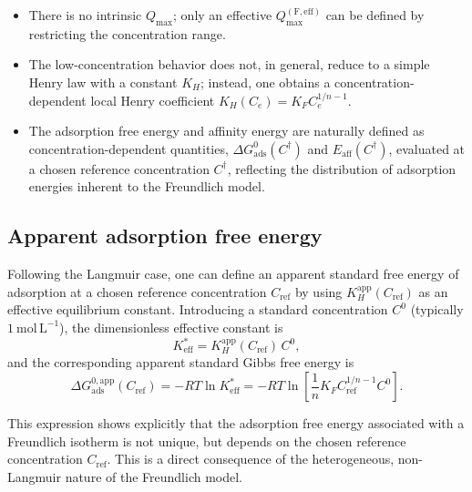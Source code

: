 	\begin{itemize}
		\item There is no intrinsic \(Q_{\max}\); only an effective
		\(Q_{\max}^{\mathrm{(F,eff)}}\) can be defined by restricting the
		concentration range.
		
		\item The low-concentration behavior does not, in general, reduce
		to a simple Henry law with a constant \(K_H\); instead, one obtains
		a concentration-dependent local Henry coefficient
		\(K_H(C_e) = K_F C_e^{1/n - 1}\).
		
		\item The adsorption free energy and affinity energy are naturally
		defined as concentration-dependent quantities,
		\(\Delta G_{\mathrm{ads}}^{0}(C^{\dagger})\) and
		\(E_{\mathrm{aff}}(C^{\dagger})\), evaluated at a chosen reference
		concentration \(C^{\dagger}\), reflecting the distribution of
		adsorption energies inherent to the Freundlich model.
	\end{itemize}
	
	\subsection{Apparent adsorption free energy}
	
	Following the Langmuir case, one can define an apparent standard free energy
	of adsorption at a chosen reference concentration $C_{\mathrm{ref}}$ by using
	$K_H^{\mathrm{app}}(C_{\mathrm{ref}})$ as an effective equilibrium constant.
	Introducing a standard concentration $C^0$ (typically
	$1~\mathrm{mol\,L^{-1}}$), the dimensionless effective constant is
	\begin{equation}
		K_{\mathrm{eff}}^{\ast}
		= K_H^{\mathrm{app}}(C_{\mathrm{ref}})\, C^0,
	\end{equation}
	and the corresponding apparent standard Gibbs free energy is
	\begin{equation}
		\Delta G_{\mathrm{ads}}^{0,\mathrm{app}}(C_{\mathrm{ref}})
		= - R T \ln K_{\mathrm{eff}}^{\ast}
		= - R T \ln\!\left[ \frac{1}{n} K_F C_{\mathrm{ref}}^{1/n - 1} C^0 \right].
	\end{equation}
	
	This expression shows explicitly that the adsorption free energy associated
	with a Freundlich isotherm is not unique, but depends on the chosen reference
	concentration $C_{\mathrm{ref}}$. This is a direct consequence of the
	heterogeneous, non-Langmuir nature of the Freundlich model.
	
